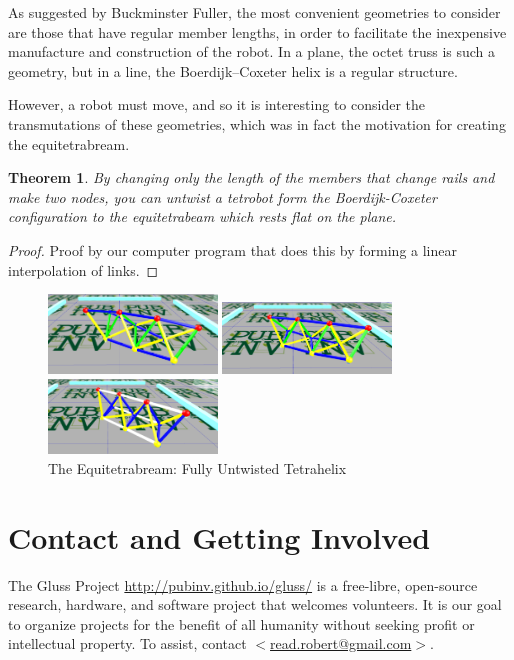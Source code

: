 \documentclass[11pt]{article}
\newtheorem{theorem}{Theorem}
\begin{document}
As suggested by Buckminster Fuller, the most convenient geometries to consider are those that have regular member
lengths, in order to facilitate the inexpensive manufacture and construction of the robot.  In a plane, the octet truss
is such a geometry, but in a line, the Boerdijk--Coxeter helix is a regular structure.

However, a robot must move, and so it is interesting to consider the transmutations of these geometries, which was in
fact the motivation for creating the equitetrabream.

\begin{theorem}
  By changing only the length of the members that change rails and make two nodes, you can untwist a tetrobot
  form the Boerdijk-Coxeter configuration to the equitetrabeam which rests flat on the plane.
\end{theorem}

\begin{proof}
  Proof by our computer program that does this by forming a linear interpolation of links.
\end{proof}

\begin{figure}[H] %
  \centering
     \includegraphics[width=0.4\textwidth]{figures/Tetrahelix1.png}
     \caption{2/3rd Twisted Tetrahelix}
     \includegraphics[width=0.4\textwidth]{figures/Tetrahelix2.png}
     \caption{1/3rd Twisted, 2/3rd Untwisted Tetrahelix}
     \includegraphics[width=0.4\textwidth]{figures/Tetrahelix3.png}
     \caption{The Equitetrabream: Fully Untwisted Tetrahelix}
\end{figure}

\section{Contact and Getting Involved}

The Gluss Project \url{http://pubinv.github.io/gluss/}
is a free-libre, open-source research, hardware, and software project that welcomes volunteers.
It is our goal to organize projects for the benefit of all humanity without seeking profit or intellectual property.
To assist, contact \href{mailto:read.robert@gmail.com}{$<$read.robert@gmail.com$>$}.



\end{document}
